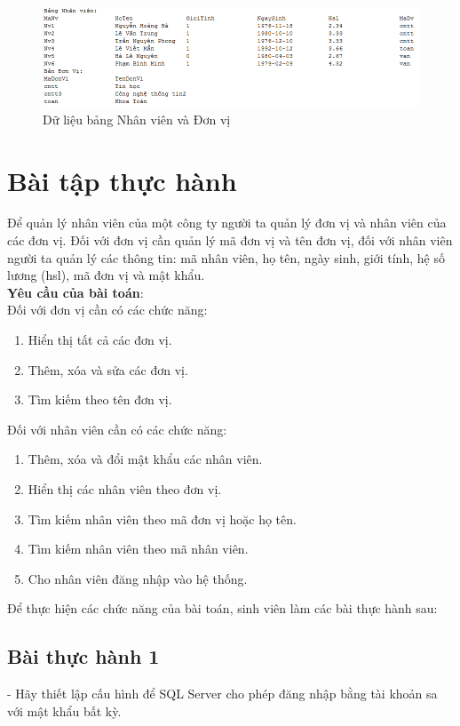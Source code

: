 	\begin{figure}[!ht]
	\centering
	\includegraphics[scale=0.5]{Figures//Hinh38.png}
	\caption{ Dữ liệu bảng Nhân viên và Đơn vị }\label{hinh38} 
\end{figure}
\section{Bài tập thực hành}
Để quản lý nhân viên của một công ty người ta quản lý đơn vị và nhân viên của các đơn vị. Đối với đơn vị cần quản lý mã đơn vị và tên đơn vị, đối với nhân viên người ta quản lý các thông tin: mã nhân viên, họ tên, ngày sinh, giới tính, hệ số lương (hsl), mã đơn vị và mật khẩu. \\
\textbf{Yêu cầu của bài toán}:\\
Đối với đơn vị cần có các chức năng:
\begin{enumerate}
	\item Hiển thị tất cả các đơn vị.
	\item Thêm, xóa và sửa các đơn vị.
	\item Tìm kiếm theo tên đơn vị.
\end{enumerate}
Đối với nhân viên cần có các chức năng:
\begin{enumerate}
	\item Thêm, xóa và đổi mật khẩu các nhân viên.
	\item Hiển thị các nhân viên theo đơn vị.
	\item Tìm kiếm nhân viên theo mã đơn vị hoặc họ tên.
	\item Tìm kiếm nhân viên theo mã nhân viên.
	\item Cho nhân viên đăng nhập vào hệ thống.
\end{enumerate}

Để thực hiện các chức năng của bài toán, sinh viên làm các bài thực hành sau:
\subsection{Bài thực hành 1}
 - Hãy thiết lập cấu hình để SQL Server cho phép đăng nhập bằng tài khoản sa với mật khẩu bất kỳ.
 
